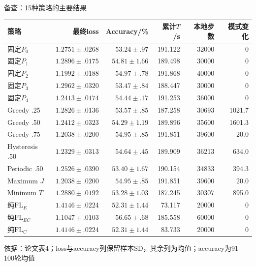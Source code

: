 \documentclass[aspectratio=169,11pt]{beamer}
\newcommand{\FlE}{\mathrm{FL}_{E}}
\newcommand{\FlEC}{\mathrm{FL}_{EC}}
\newcommand{\FlC}{\mathrm{FL}_{C}}
\newcommand{\src}[1]{\vfill{\color{Gray}\fontsize{7.5}{9}\selectfont 依据：#1\par}}
\begin{document}
\begin{frame}{备查：15种策略的主要结果}
\centering
\fontsize{8.5}{9.6}\selectfont
\renewcommand{\arraystretch}{1.02}
\begin{tabular}{@{}lrrrrr@{}}
\toprule
策略 & 最终loss & Accuracy/\% & 累计$T$/s & 本地步数 & 模式变化\\
\midrule
固定$P_0$&$1.2751\pm.0268$&$53.24\pm.97$&191.122&32000&0\\
固定$P_1$&$1.2896\pm.0175$&$54.81\pm1.66$&189.498&30000&0\\
固定$P_2$&$1.1992\pm.0188$&$54.97\pm.78$&191.868&40000&0\\
固定$P_3$&$1.2962\pm.0320$&$53.47\pm.84$&188.447&30000&0\\
固定$P_4$&$1.2413\pm.0174$&$54.44\pm.17$&191.253&36000&0\\
\midrule
Greedy .25&$1.2826\pm.0136$&$53.57\pm.85$&187.258&30693&1021.7\\
Greedy .50&$1.2412\pm.0323$&$54.29\pm1.19$&189.896&35600&1601.3\\
Greedy .75&$1.2038\pm.0200$&$54.95\pm.85$&191.851&39600&20.0\\
Hysteresis .50&$1.2329\pm.0313$&$54.64\pm.45$&189.909&36213&634.0\\
Periodic .50&$1.2526\pm.0390$&$53.40\pm1.67$&190.154&34833&394.3\\
Maximum $J$&$1.2038\pm.0200$&$54.95\pm.85$&191.851&39600&20.0\\
Minimum $T$&$1.2880\pm.0192$&$53.28\pm1.03$&187.245&30307&895.0\\
\midrule
纯$\FlE$&$1.4146\pm.0224$&$52.31\pm1.44$&73.117&20000&0\\
纯$\FlEC$&$1.1047\pm.0103$&$56.65\pm.68$&185.558&60000&0\\
纯$\FlC$&$1.4146\pm.0224$&$52.31\pm1.44$&83.733&20000&0\\
\bottomrule
\end{tabular}\par
\src{论文表4；loss与accuracy列保留样本SD，其余列为均值；accuracy为91--100轮均值}
\end{frame}
\end{document}
